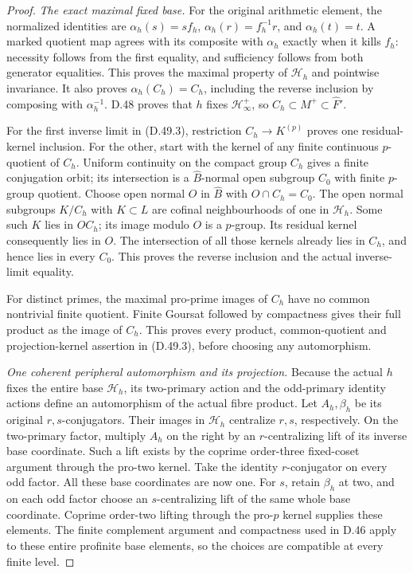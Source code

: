 \begin{proof}
\emph{The exact maximal fixed base.}
For the original arithmetic element, the normalized
identities are
\(\alpha_h(s)=s f_h\),
\(\alpha_h(r)=f_h^{-1}r\), and
\(\alpha_h(t)=t\).
A marked quotient map agrees with its composite with
\(\alpha_h\) exactly when it kills \(f_h\): necessity
follows from the first equality, and sufficiency follows
from both generator equalities. This proves the maximal
property of \(\mathcal H_h\) and pointwise invariance.
It also proves \(\alpha_h(C_h)=C_h\), including the
reverse inclusion by composing with \(\alpha_h^{-1}\).
D.48 proves that \(h\) fixes \(\mathcal H^+_\infty\),
so \(C_h\subset M^+\subset\widehat F'\).

For the first inverse limit in (D.49.3), restriction
\(C_h\to K^{(p)}\) proves one residual-kernel inclusion.
For the other, start with the kernel of any finite
continuous \(p\)-quotient of \(C_h\). Uniform continuity
on the compact group \(C_h\) gives a finite conjugation
orbit; its intersection is a \(\widehat B\)-normal open
subgroup \(C_0\) with finite \(p\)-group quotient.
Choose open normal \(O\) in \(\widehat B\) with
\(O\cap C_h=C_0\). The open normal subgroups \(K/C_h\)
with \(K\subset L\) are cofinal neighbourhoods of one
in \(\mathcal H_h\). Some such \(K\) lies in \(OC_h\);
its image modulo \(O\) is a \(p\)-group. Its residual
kernel consequently lies in \(O\). The intersection of
all those kernels already lies in \(C_h\), and hence
lies in every \(C_0\). This proves the reverse inclusion
and the actual inverse-limit equality.

For distinct primes, the maximal pro-prime images of
\(C_h\) have no common nontrivial finite quotient.
Finite Goursat followed by compactness gives their full
product as the image of \(C_h\). This proves every
product, common-quotient and projection-kernel assertion
in (D.49.3), before choosing any automorphism.

\emph{One coherent peripheral automorphism and its projection.}
Because the actual \(h\) fixes the entire base
\(\mathcal H_h\), its two-primary action and the
odd-primary identity actions define an automorphism
of the actual fibre product. Let \(A_h,\beta_h\)
be its original \(r,s\)-conjugators. Their images in
\(\mathcal H_h\) centralize \(r,s\), respectively.
On the two-primary factor, multiply \(A_h\) on the
right by an \(r\)-centralizing lift of its inverse
base coordinate. Such a lift exists by the coprime
order-three fixed-coset argument through the pro-two
kernel. Take the identity \(r\)-conjugator on every
odd factor. All these base coordinates are now one.
For \(s\), retain \(\beta_h\) at two, and on each odd
factor choose an \(s\)-centralizing lift of the same
whole base coordinate. Coprime order-two lifting
through the pro-\(p\) kernel supplies these elements.
The finite complement argument and compactness used
in D.46 apply to these entire profinite base elements,
so the choices are compatible at every finite level.


\end{proof}
